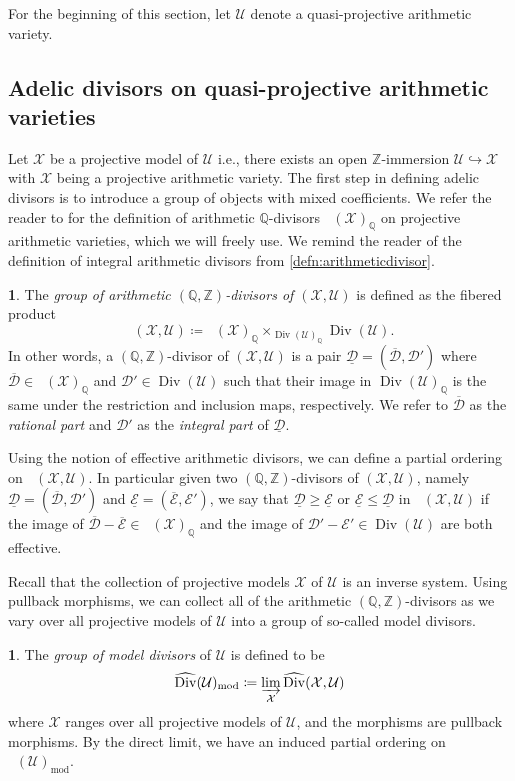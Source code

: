 \documentclass[11pt,reqno]{amsart}
\newcommand{\mZ}{\mathbb{Z}}
\newcommand{\mQ}{\mathbb{Q}}
\newcommand{\cX}{\mathcal{X}}
\newcommand{\cE}{\mathcal{E}}
\newcommand{\cD}{\mathcal{D}}
\newcommand{\cU}{\mathcal{U}}
\theoremstyle{theorem}
\numberwithin{equation}{subsection}
\numberwithin{equation}{subsection}
\theoremstyle{definition}
\newtheorem{definition}[subsubsection]{\text{Definition}}
\theoremstyle{remark}
\numberwithin{equation}{subsubsection} \numberwithin{figure}{section}
\DeclareMathOperator{\Div}{Div}
\DeclareMathOperator{\aDiv}{\widehat{Div}}
\newcommand{\cdef}[1]{\textsf{\textit{#1}}}
\renewcommand{\leq}{\leqslant}
\renewcommand{\geq}{\geqslant}
\DeclareMathOperator{\model}{mod}
\begin{document}
For the beginning of this section, let $\cU$ denote a quasi-projective arithmetic variety. 
\subsection{Adelic divisors on quasi-projective arithmetic varieties}
Let $\cX$ be a projective model of $\cU$ i.e., there exists an open $\mZ$-immersion $\cU \hookrightarrow \cX$ with $\cX$ being a projective arithmetic variety. 
The first step in defining adelic divisors is to introduce a group of objects with mixed coefficients. 
We refer the reader to \cite[Section 2.3.1]{YuanZhang:AdelicLineBundles} for the definition of arithmetic $\mQ$-divisors $\aDiv(\cX)_{\mQ}$ on projective arithmetic varieties, which we will freely use. 
We remind the reader of the definition of integral arithmetic divisors from \autoref{defn:arithmeticdivisor}. 

\begin{definition}
The \cdef{group of arithmetic $(\mQ,\mZ)$-divisors of $(\cX,\cU)$} is defined as the fibered product
\[
\aDiv(\cX,\cU) \coloneqq \aDiv(\cX)_{\mQ} \times_{\Div(\cU)_{\mQ}} \Div(\cU).
\]
In other words, a $(\mQ,\mZ)$-divisor of $(\cX,\cU)$ is a pair $\underline{\cD} = (\overline{\cD},\cD')$ where $\overline{\cD} \in \aDiv(\cX)_{\mQ}$ and $\cD' \in \Div(\cU)$ such that their image in $\Div(\cU)_{\mQ}$ is the same under the restriction and inclusion maps, respectively. 
We refer to $\overline{\cD}$ as the \cdef{rational part} and $\cD'$ as the \cdef{integral part} of $\underline{\cD}$. 
\end{definition}

Using the notion of effective arithmetic divisors, we can define a partial ordering on $\aDiv(\cX,\cU)$. In particular given two $(\mQ,\mZ)$-divisors of $(\cX,\cU)$, namely $\underline{\cD} = (\overline{\cD},\cD')$ and $\underline{\cE} = (\overline{\cE},\cE')$, we say that $\underline{\cD} \geq \underline{\cE}$ or $\underline{\cE} \leq \underline{\cD}$ in $\aDiv(\cX,\cU)$ if the image of $\overline{\cD}  - \overline{\cE} \in \aDiv(\cX)_{\mQ}$ and the image of $\cD' - \cE' \in \Div(\cU)$ are both effective. 


Recall that the collection of projective models $\cX$ of $\cU$ is an inverse system. 
Using pullback morphisms, we can collect all of the arithmetic $(\mQ,\mZ)$-divisors as we vary over all projective models of $\cU$ into a group of so-called model divisors. 

\begin{definition}
The \cdef{group of model divisors} of $\cU$ is defined to be
\[
\aDiv(\cU)_{\model} \coloneqq \varinjlim_{\cX} \aDiv(\cX,\cU)
\]
where $\cX$ ranges over all projective models of $\cU$, and the morphisms are pullback morphisms. 
By the direct limit, we have an induced partial ordering on $\aDiv(\cU)_{\model}$. 
\end{definition}
\end{document}
